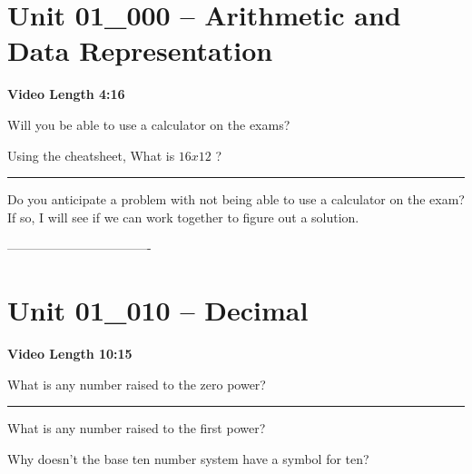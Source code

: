 \documentclass[letterpaper,12pt]{exam}
\newcommand{\unit}{Unit 01}
\begin{document}
\section*{\unit\_000 -- Arithmetic and Data Representation} 
\par{\selectfont\textbf{Video Length 4:16 }}
\begin{questions}

\begin{samepage}
    \question Will you be able to use a calculator on the exams?
    \vspace{5mm}
\end{samepage}
\par
 

 \begin{samepage} 
     \question Using the cheatsheet, What is $ 16 x 12 $ ? \rule{2cm}{0.15mm}     \vspace{5mm}
 \end{samepage}
 \par
 \begin{samepage}
     \question Do you anticipate a problem with not being able to use a calculator on the exam?  If so, I will see if we can work together to figure out a solution.
     \vspace{5mm}
 \end{samepage}
 \par
   
----------------------------------
\section*{\unit\_010 -- Decimal }
\par{\selectfont\textbf{Video Length 10:15}}
\begin{samepage}
    \question What is any number raised to the zero power?
    \vspace{5mm}
\end{samepage}
\par
\rule{0.5\textwidth}{.4pt} %

\begin{samepage}
    \question What is any number raised to the first power?
    \vspace{5mm}
\end{samepage}
\par
 

\begin{samepage}
    \question Why doesn't the base ten number system have a symbol for ten?
    \vspace{5mm}
\end{samepage}
\par
 

\end{questions}
\end{document}
